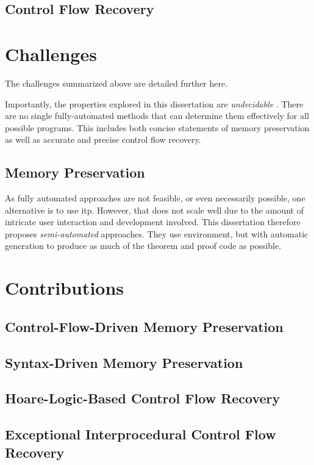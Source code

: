 \subsection{Control Flow Recovery}

\section{Challenges}
The challenges summarized above are detailed further here.

Importantly, the properties explored in this dissertation are \emph{undecidable} \autocite{rice1953classes,horspool1980approach,ouimet2008formal}.
There are no single fully-automated methods that can determine them effectively for all possible programs.
This includes both concise statements of memory preservation as well as accurate and precise control flow recovery.

\subsection{Memory Preservation}
As fully automated approaches are not feasible, or even necessarily possible, one alternative is to use \ac{itp}.
However, that does not scale well due to the amount of intricate user interaction and development involved.
This dissertation therefore proposes \emph{semi-automated} approaches.
They use  environment, but with automatic generation to produce as much of the theorem and proof code as possible.

\section{Contributions}

\subsection{Control-Flow-Driven Memory Preservation}
\subsection{Syntax-Driven Memory Preservation}

\subsection{Hoare-Logic-Based Control Flow Recovery}
\subsection{Exceptional Interprocedural Control Flow Recovery}

